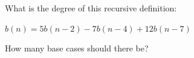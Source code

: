 What is the degree of this recursive definition:



$b(n) = 5b(n-2) - 7b(n-4) + 12b(n-7)$



How many base cases should there be?

